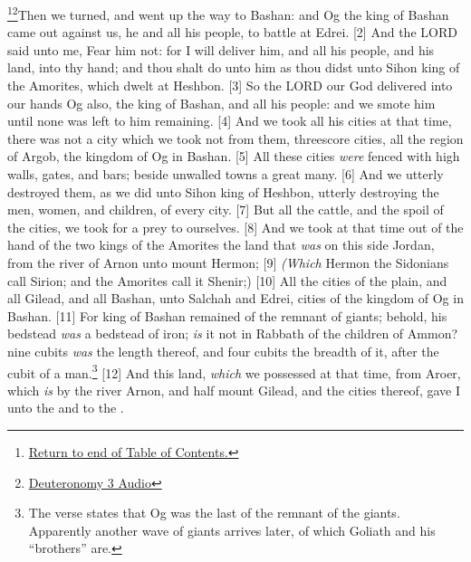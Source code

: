 \footnote{\textcolor[cmyk]{0.99998,1,0,0}{\hyperlink{TOC}{Return to end of Table of Contents.}}}\footnote{\href{https://audiobible.com/bible/deuteronomy_3.html}{\textcolor[cmyk]{0.99998,1,0,0}{Deuteronomy 3 Audio}}}\textcolor[cmyk]{0.99998,1,0,0}{Then we turned, and went up the way to Bashan: and Og the king of Bashan came out against us, he and all his people, to battle at Edrei.}
[2] \textcolor[cmyk]{0.99998,1,0,0}{And the LORD said unto me, Fear him not: for I will deliver him, and all his people, and his land, into thy hand; and thou shalt do unto him as thou didst unto Sihon king of the Amorites, which dwelt at Heshbon.}
[3] \textcolor[cmyk]{0.99998,1,0,0}{So the LORD our God delivered into our hands Og also, the king of Bashan, and all his people: and we smote him until none was left to him remaining.}
[4] \textcolor[cmyk]{0.99998,1,0,0}{And we took all his cities at that time, there was not a city which we took not from them, threescore cities, all the region of Argob, the kingdom of Og in Bashan.}
[5] \textcolor[cmyk]{0.99998,1,0,0}{All these cities \emph{were} fenced with high walls, gates, and bars; beside unwalled towns a great many.}
[6] \textcolor[cmyk]{0.99998,1,0,0}{And we utterly destroyed them, as we did unto Sihon king of Heshbon, utterly destroying the men, women, and children, of every city.}
[7] \textcolor[cmyk]{0.99998,1,0,0}{But all the cattle, and the spoil of the cities, we took for a prey to ourselves.}
[8] \textcolor[cmyk]{0.99998,1,0,0}{And we took at that time out of the hand of the two kings of the Amorites the land that \emph{was} on this side Jordan, from the river of Arnon unto mount Hermon;}
[9] \textcolor[cmyk]{0.99998,1,0,0}{\emph{(Which} Hermon the Sidonians call Sirion; and the Amorites call it Shenir;)}
[10] \textcolor[cmyk]{0.99998,1,0,0}{All the cities of the plain, and all Gilead, and all Bashan, unto Salchah and Edrei, cities of the kingdom of Og in Bashan.}
[11] \textcolor[cmyk]{0.99998,1,0,0}{For  king of Bashan remained of the remnant of giants; behold, his bedstead \emph{was} a bedstead of iron; \emph{is} it not in Rabbath of the children of Ammon? nine cubits \emph{was} the length thereof, and four cubits the breadth of it, after the cubit of a man.}\footnote{The verse states that Og was the last of the remnant of the giants. Apparently another wave of giants arrives later, of which Goliath and his ``brothers'' are.}
[12] \textcolor[cmyk]{0.99998,1,0,0}{And this land, \emph{which} we possessed at that time, from Aroer, which \emph{is} by the river Arnon, and half mount Gilead, and the cities thereof, gave I unto the  and to the .}
